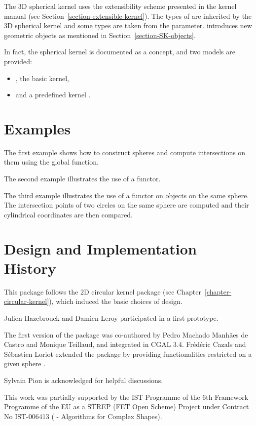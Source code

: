The 3D spherical kernel uses the extensibility scheme presented in the
kernel manual (see Section~\ref{section-extensible-kernel}). The types
of  are inherited by the 3D spherical kernel and some
types are taken from the 
parameter.  introduces new geometric objects
as mentioned in Section~\ref{section-SK-objects}.

In fact, the spherical kernel is documented as a concept,
 and two models are provided: 
\begin{itemize}
\item {} , the basic kernel,
\item {} and a predefined kernel .
\end{itemize}

\section{Examples}

The first example shows how to construct spheres and compute
intersections on them using the global function.


The second example illustrates the use of a functor. 


{\color{cyan} %
  The third example illustrates the use of a functor on objects on the
  same sphere.  The intersection points of two circles on
  the same sphere are computed and their cylindrical coordinates are
  then compared.

} %

\section{Design and Implementation History}

This package follows the 2D circular kernel package (see
Chapter~\ref{chapter-circular-kernel}), which induced the basic
choices of design.

Julien Hazebrouck and Damien Leroy participated in a first
prototype.

{\color{cyan} %
  The first version of the package was co-authored by Pedro Machado
  Manh\~{a}es de Castro and Monique Teillaud, and integrated in CGAL
  3.4.  Fr\'ed\'eric Cazals and S\'ebastien Loriot extended the
  package by providing functionalities restricted on a given sphere
  \cite{cclt-dc3sk-08}.  
}%

Sylvain Pion is acknowledged for helpful discussions.

This work was partially supported by the IST Programme of the 6th
Framework Programme of the EU as a STREP (FET Open Scheme) Project
under Contract No IST-006413 ( -
Algorithms for Complex Shapes).
